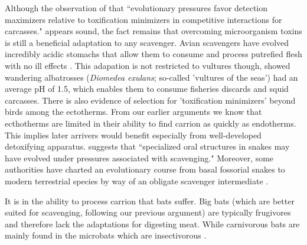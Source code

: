 \documentclass[a4paper,12pt]{article}
\begin{document}
Although the observation of \cite{shivik2006vultures} that ``evolutionary pressures favor detection maximizers relative to toxification minimizers in competitive interactions for carcasses." appears sound, the fact remains that overcoming microorganism toxins is still a beneficial adaptation to any scavenger. 
Avian scavengers have evolved incredibly acidic stomachs that allow them to consume and process putrefied flesh with no ill effects \citep{houston1975digestive,roggenbuck2014microbiome}. 
This adapation is not restricted to vultures though, \cite{gremillet2012vultures} showed wandering albatrosses (\textit{Diomedea exulans}; so-called 'vultures of the seas') had an average pH of 1.5, which enables them to consume fisheries discards and squid carcasses. 
There is also evidence of selection for 'toxification minimizers' beyond birds among the ectotherms.
From our earlier arguments we know that ecthotherms are limited in their ability to find carrion as quickly as endotherms. 
This implies later arrivers would benefit especially from well-developed detoxifying apparatus. 
\cite{shivik2006vultures} suggests that ``specialized oral structures in snakes may have evolved under pressures associated with scavenging."
Moreover, some authorities have charted an evolutionary course from basal fossorial snakes to modern terrestrial species by way of an obligate scavenger intermediate \citep{bauchot2006snakes}. 


It is in the ability to process carrion that bats suffer.
Big bats (which are better suited for scavenging, following our previous argument) are typically frugivores and therefore lack the adaptations for digesting  meat.
While carnivorous bats are mainly found in the microbats which are insectivorous \citep{aguirre2003implications}.
\end{document}

